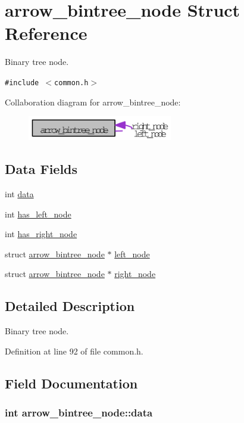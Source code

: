 \hypertarget{structarrow__bintree__node}{
\section{arrow\_\-bintree\_\-node Struct Reference}
\label{structarrow__bintree__node}
}
Binary tree node.  


{\tt \#include $<$common.h$>$}

Collaboration diagram for arrow\_\-bintree\_\-node:\nopagebreak
\begin{figure}[H]
\begin{center}
\leavevmode
\includegraphics[width=179pt]{structarrow__bintree__node__coll__graph}
\end{center}
\end{figure}
\subsection*{Data Fields}
\begin{CompactItemize}
\item 
int \hyperlink{structarrow__bintree__node_de01c6e7aa823db027836d77e7ce48b6}{data}
\item 
int \hyperlink{structarrow__bintree__node_a359d3d029023fb8763af3329207ee53}{has\_\-left\_\-node}
\item 
int \hyperlink{structarrow__bintree__node_f6f8bb35c520a88841a810777e9bc186}{has\_\-right\_\-node}
\item 
struct \hyperlink{structarrow__bintree__node}{arrow\_\-bintree\_\-node} $\ast$ \hyperlink{structarrow__bintree__node_e7eb125cad02704a57796b16c49b2983}{left\_\-node}
\item 
struct \hyperlink{structarrow__bintree__node}{arrow\_\-bintree\_\-node} $\ast$ \hyperlink{structarrow__bintree__node_4875801983f2b0220212951e6c0130af}{right\_\-node}
\end{CompactItemize}


\subsection{Detailed Description}
Binary tree node. 

Definition at line 92 of file common.h.

\subsection{Field Documentation}
\hypertarget{structarrow__bintree__node_de01c6e7aa823db027836d77e7ce48b6}{
\subsubsection[{data}]{\setlength{\rightskip}{0pt plus 5cm}int {\bf arrow\_\-bintree\_\-node::data}}}
\label{structarrow__bintree__node_de01c6e7aa823db027836d77e7ce48b6}


